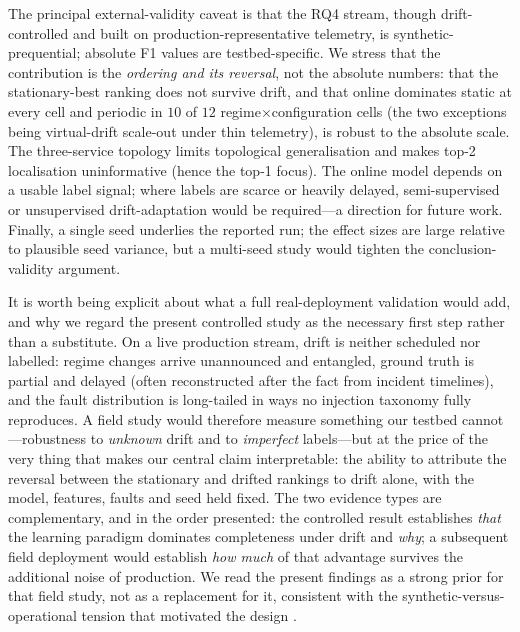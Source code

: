 \documentclass[acmsmall]{acmart}
\begin{document}
The principal external-validity caveat is that the RQ4 stream, though drift-controlled and built on production-representative telemetry, is synthetic-prequential; absolute F1 values are testbed-specific. We stress that the contribution is the \emph{ordering and its reversal}, not the absolute numbers: that the stationary-best ranking does not survive drift, and that online dominates static at every cell and periodic in $10$ of $12$ regime$\times$configuration cells (the two exceptions being virtual-drift scale-out under thin telemetry), is robust to the absolute scale. The three-service topology limits topological generalisation and makes top-2 localisation uninformative (hence the top-1 focus). The online model depends on a usable label signal; where labels are scarce or heavily delayed, semi-supervised or unsupervised drift-adaptation would be required---a direction for future work. Finally, a single seed underlies the reported run; the effect sizes are large relative to plausible seed variance, but a multi-seed study would tighten the conclusion-validity argument.

It is worth being explicit about what a full real-deployment validation would add, and why we regard the present controlled study as the necessary first step rather than a substitute. On a live production stream, drift is neither scheduled nor labelled: regime changes arrive unannounced and entangled, ground truth is partial and delayed (often reconstructed after the fact from incident timelines), and the fault distribution is long-tailed in ways no injection taxonomy fully reproduces. A field study would therefore measure something our testbed cannot---robustness to \emph{unknown} drift and to \emph{imperfect} labels---but at the price of the very thing that makes our central claim interpretable: the ability to attribute the reversal between the stationary and drifted rankings to drift alone, with the model, features, faults and seed held fixed. The two evidence types are complementary, and in the order presented: the controlled result establishes \emph{that} the learning paradigm dominates completeness under drift and \emph{why}; a subsequent field deployment would establish \emph{how much} of that advantage survives the additional noise of production. We read the present findings as a strong prior for that field study, not as a replacement for it, consistent with the synthetic-versus-operational tension that motivated the design \cite{hrusto2026,islam2021}.

\end{document}
